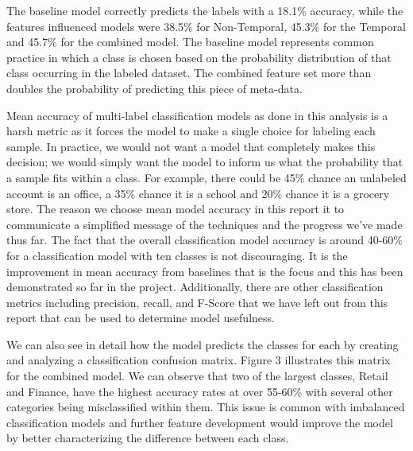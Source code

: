 The baseline model correctly predicts the labels with a 18.1\% accuracy, while the features influenced models were 38.5\% for Non-Temporal, 45.3\% for the Temporal and 45.7\% for the combined model.  The baseline model represents common practice in which a class is chosen based on the probability distribution of that class occurring in the labeled dataset. The combined feature set more than doubles the probability of predicting this piece of meta-data.

Mean accuracy of multi-label classification models as done in this analysis is a harsh metric as it forces the model to make a single choice for labeling each sample. In practice, we would not want a model that completely makes this decision; we would simply want the model to inform us what the probability that a sample fits within a class. For example, there could be 45\% chance an unlabeled account is an office, a 35\% chance it is a school and 20\% chance it is a grocery store. The reason we choose mean model accuracy in this report it to communicate a simplified message of the techniques and the progress we’ve made thus far. The fact that the overall classification model accuracy is around 40-60\% for a classification model with ten classes is not discouraging. It is the improvement in mean accuracy from baselines that is the focus and this has been demonstrated so far in the project. Additionally, there are other classification metrics including precision, recall, and F-Score that we have left out from this report that can be used to determine model usefulness. 

We can also see in detail how the model predicts the classes for each by creating and analyzing a classification confusion matrix. Figure 3 illustrates this matrix for the combined model. We can observe that two of the largest classes, Retail and Finance, have the highest accuracy rates at over 55-60\% with several other categories being misclassified within them.  This issue is common with imbalanced classification models and further feature development would improve the model by better characterizing the difference between each class.
